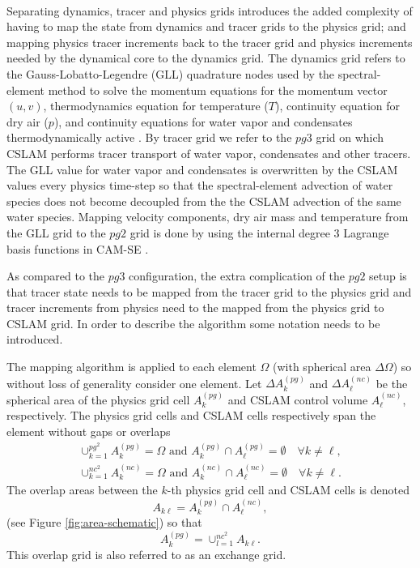 {\color{red}{[DEFINE INCREMENT VERSUS TENDENCY CLEARLY; STRAIGHTEN OUT NOTATION FOR CSLAM GRID AND PG3 - ALSO IN FIGURES]}}\\

Separating dynamics, tracer and physics grids introduces the added complexity of having to map the state from dynamics and tracer grids to the physics grid; and mapping physics tracer increments back to the tracer grid and physics increments needed by the dynamical core to the dynamics grid. The dynamics grid refers to the Gauss-Lobatto-Legendre (GLL) quadrature nodes used by the spectral-element method to solve the momentum equations for the momentum vector $(u,v)$, thermodynamics equation for temperature ($T$), continuity equation for dry air ($p$), and continuity equations for water vapor and condensates thermodynamically active \citep[see, e.g., ][ for details]{LetAl2018JAMES}. By tracer grid we refer to the $pg3$ grid on which CSLAM performs tracer transport of water vapor, condensates and other tracers. The GLL value for water vapor and condensates is overwritten by the CSLAM values every physics time-step so that the spectral-element advection of water species does not become decoupled from the the CSLAM advection of the same water species. Mapping velocity components, dry air mass and temperature from the GLL grid to the $pg2$ grid is done by using the internal degree 3 Lagrange basis functions in CAM-SE \citep[as described in  ][ for pg3; exactly the same methods can be used for $pg2$]{HL2018MWR}.

As compared to the $pg3$ configuration, the extra complication of the $pg2$ setup is that tracer state needs to be mapped from the tracer grid to the physics grid and tracer increments from physics need to the mapped from the physics grid to CSLAM grid. In order to describe the algorithm some notation needs to be introduced.

The mapping algorithm is applied to each element $\Omega$ (with spherical area $\Delta \Omega$) so without loss of generality consider one element. Let $\Delta A^{(pg)}_k$ and $\Delta A^{(nc)}_\ell$ be the spherical area of the physics grid cell $A^{(pg)}_k$ and CSLAM control volume $A^{(nc)}_\ell$, respectively. The physics grid cells and CSLAM cells respectively span the element without gaps or overlaps
\begin{eqnarray}
\cup_{k=1}^{pg^2}A^{(pg)}_k=\Omega \text{ and } A^{(pg)}_k \cap A^{(pg)}_\ell = \emptyset \quad \forall k\ne \ell,\\
\cup_{k=1}^{nc^2}A^{(nc)}_k=\Omega \text{ and } A^{(nc)}_k \cap A^{(nc)}_\ell = \emptyset \quad \forall k\ne \ell.
\end{eqnarray}
The overlap areas between the $k$-th physics grid cell and CSLAM cells is denoted
\begin{equation}
A_{k\ell}=A^{(pg)}_k \cap A^{(nc)}_\ell,
\end{equation}
(see Figure \ref{fig:area-schematic}) so that
\begin{equation}
A^{(pg)}_k=\cup_{l=1}^{nc^2}A_{k\ell}.
\end{equation}
This overlap grid is also referred to as an exchange grid.
